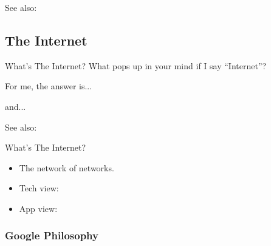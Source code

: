 See also: 

\subsection[Internet]{The Internet}

\begin{frame}{What's The Internet?}
  What pops up in your mind if I say ``Internet''?\pause
  
  \begin{block}{For me, the answer is...}
    \begin{center}
    \end{center}
      and...\pause
    \begin{center}
    \end{center}
  \end{block}
\end{frame}

See also: 

\begin{frame}{What's The Internet?}
  \begin{itemize}
  \item The network of networks.
  \item Tech view: \href{http://en.wikipedia.org/wiki/Tcp/ip}{{\tcpip}}
  \item App view: \href{http://en.wikipedia.org/wiki/Google}{\googlelogo}
  \end{itemize}
\end{frame}

\subsubsection[Why Google?]{Google Philosophy}

